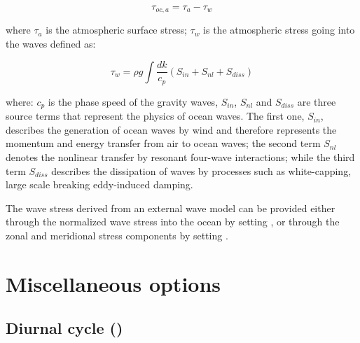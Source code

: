 \documentclass[../tex_main/NEMO_manual]{subfiles}
\begin{document}
\begin{equation} \label{eq:sbc_wave_tauoc}
\tau_{oc,a} = \tau_a - \tau_w
\end{equation}

where $\tau_a$ is the atmospheric surface stress;
$\tau_w$ is the atmospheric stress going into the waves defined as:

\begin{equation} \label{eq:sbc_wave_tauw}
\tau_w = \rho g \int {\frac{dk}{c_p} (S_{in}+S_{nl}+S_{diss})}
\end{equation}

where: $c_p$ is the phase speed of the gravity waves,
$S_{in}$, $S_{nl}$ and $S_{diss}$ are three source terms that represent 
the physics of ocean waves. The first one, $S_{in}$, describes the generation 
of ocean waves by wind and therefore represents the momentum and energy transfer 
from air to ocean waves; the second term $S_{nl}$ denotes 
the nonlinear transfer by resonant four-wave interactions; while the third term $S_{diss}$ 
describes the dissipation of waves by processes such as white-capping, large scale breaking 
eddy-induced damping.

The wave stress derived from an external wave model can be provided either through the normalized 
wave stress into the ocean by setting , or through the zonal and 
meridional stress components by setting .


\section{Miscellaneous options}
\label{sec:SBC_misc}

\subsection{Diurnal cycle (\protect{})}
\label{subsec:SBC_dcy}
%
\end{document}
